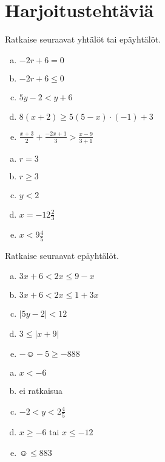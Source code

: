 \section{Harjoitustehtäviä}
\begin{tehtava}
    Ratkaise seuraavat yhtälöt tai epäyhtälöt.
    \begin{enumerate}[a)]
        \item $-2r+6=0$
        \item $-2r+6\leq 0$
        \item $5y-2<y+6$
        \item $8(x+2)\geq 5(5-x)\cdot (-1)+3$
        \item $\frac{x+3}{2}+\frac{-2x+1}{3}>\frac{x-9}{3+1}$
    \end{enumerate}
    \begin{vastaus}
        \begin{enumerate}[a)]
            \item $r=3$
            \item $r\geq 3$
            \item $y<2$
            \item $x=-12\frac{2}{3}$
            \item $x<9\frac{4}{5}$
        \end{enumerate}
    \end{vastaus}
\end{tehtava}

\begin{tehtava}
    Ratkaise seuraavat epäyhtälöt.
    \begin{enumerate}[a)]
        \item $3x+6<2x\leq 9-x$
        \item $3x+6<2x\leq 1+3x$
        \item $|5y-2|<12$
        \item $3\leq |x+9|$
        \item $-\smiley{}-5\geq-888$
    \end{enumerate}
    \begin{vastaus}
        \begin{enumerate}[a)]
            \item $x<-6$
            \item ei ratkaisua
            \item $-2<y<2\frac{4}{5}$
            \item $x\geq -6$ tai $x\leq -12$
            \item $\smiley{}\leq 883$
        \end{enumerate}
    \end{vastaus}
\end{tehtava}


